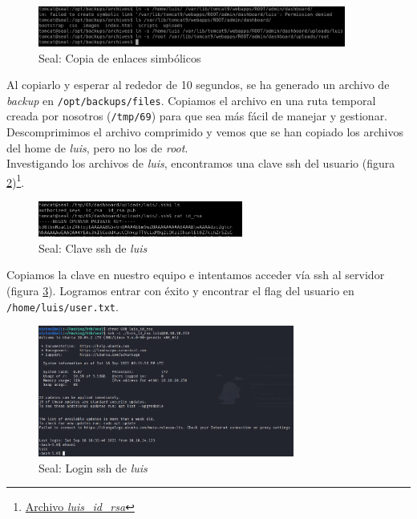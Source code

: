\begin{figure}[h]
    \centering
    \includegraphics[width=0.9\textwidth]{images/machines/seal/enlaces-simb.png}
    \caption{Seal: Copia de enlaces simbólicos}
    \label{fig:seal-simb}
\end{figure}

Al copiarlo y esperar al rededor de 10 segundos, se ha generado un archivo de \textit{backup} en \texttt{/opt/backups/files}. Copiamos el archivo en una ruta temporal creada por nosotros (\texttt{/tmp/69}) para que sea más fácil de manejar y gestionar. Descomprimimos el archivo comprimido y vemos que se han copiado los archivos del home de \textit{luis}, pero no los de \textit{root}.\\

Investigando los archivos de \textit{luis}, encontramos una clave \acrshort{ssh} del usuario (figura \ref{fig:seal-luis-clave})\footnote{\href{https://github.com/VictorNS69/TFM/blob/main/machines/seal/luis_id_rsa}{Archivo \textit{luis\_id\_rsa}}}.

\begin{figure}[h]
    \centering
    \includegraphics[width=0.6\textwidth]{images/machines/seal/rsa-luis.png}
    \caption{Seal: Clave \acrshort{ssh} de \textit{luis}}
    \label{fig:seal-luis-clave}
\end{figure}

Copiamos la clave en nuestro equipo e intentamos acceder vía \acrshort{ssh} al servidor (figura \ref{fig:seal-ssh-luis}). Logramos entrar con éxito y encontrar el flag del usuario en \texttt{/home/luis/user.txt}.
\begin{figure}[h]
    \centering
    \includegraphics[width=0.75\textwidth]{images/machines/seal/ssh-luis.png}
    \caption{Seal: Login \acrshort{ssh} de \textit{luis}}
    \label{fig:seal-ssh-luis}
\end{figure}

